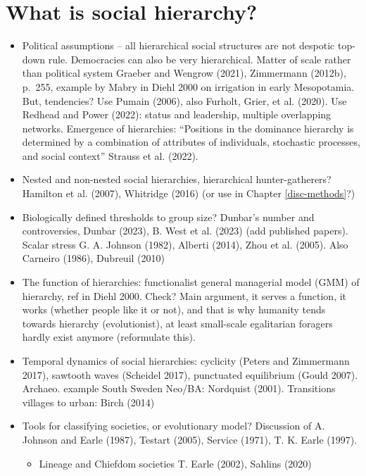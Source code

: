 \documentclass[
  12pt,
  a4paper, twoside]{book}
\providecommand{\tightlist}{%
  \setlength{\itemsep}{0pt}\setlength{\parskip}{0pt}}
\begin{document}
\hypertarget{social-hierarchy}{%
\section{What is social hierarchy?}\label{social-hierarchy}}

\begin{itemize}
\item
  Political assumptions -- all hierarchical social structures are not despotic top-down rule. Democracies can also be very hierarchical. Matter of scale rather than political system Graeber and Wengrow (2021), Zimmermann (2012b), p.~255, example by Mabry in Diehl 2000 on irrigation in early Mesopotamia. But, tendencies? Use Pumain (2006), also Furholt, Grier, et al. (2020). Use Redhead and Power (2022): status and leadership, multiple overlapping networks. Emergence of hierarchies: ``Positions in the dominance hierarchy is determined by a combination of attributes of individuals, stochastic processes, and social context'' Strauss et al. (2022).
\item
  Nested and non-nested social hierarchies, hierarchical hunter-gatherers? Hamilton et al. (2007), Whitridge (2016) (or use in Chapter \ref{disc-methods}?)
\item
  Biologically defined thresholds to group size? Dunbar's number and controversies, Dunbar (2023), B. West et al. (2023) (add published papers). Scalar stress G. A. Johnson (1982), Alberti (2014), Zhou et al. (2005). Also Carneiro (1986), Dubreuil (2010)
\item
  The function of hierarchies: functionalist general managerial model (GMM) of hierarchy, ref in Diehl 2000. Check? Main argument, it serves a function, it works (whether people like it or not), and that is why humanity tends towards hierarchy (evolutionist), at least small-scale egalitarian foragers hardly exist anymore (reformulate this).
\item
  Temporal dynamics of social hierarchies: cyclicity (Peters and Zimmermann 2017), sawtooth waves (Scheidel 2017), punctuated equilibrium (Gould 2007). Archaeo. example South Sweden Neo/BA: Nordquist (2001). Transitions villages to urban: Birch (2014)
\end{itemize}

\begin{itemize}
\item
  Tools for classifying societies, or evolutionary model? Discussion of A. Johnson and Earle (1987), Testart (2005), Service (1971), T. K. Earle (1997).

  \begin{itemize}
  \tightlist
  \item
    Lineage and Chiefdom societies T. Earle (2002), Sahlins (2020)
  \end{itemize}
\end{itemize}
\end{document}
